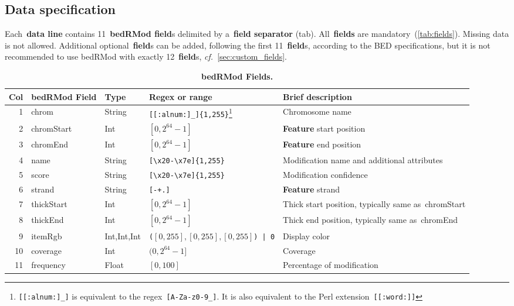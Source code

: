 \documentclass[11pt]{article}
\begin{document}
\subsection{Data specification}\label{sec:data}

Each~\textbf{data line} contains 11~\textbf{\acs{bedRMod} field}s delimited by a~\textbf{field separator} (tab).
All~\textbf{fields} are mandatory~(\autoref{tab:fields}). Missing data is not allowed.
Additional optional~\textbf{field}s can be added, following the first 11~\textbf{field}s, according to the \acs{BED} specifications, but 
it is not recommended to use \acs{bedRMod} with exactly 12~\textbf{field}s, \textit{cf.}~\autoref{sec:custom_fields}.

\begin{savenotes}
  \begin{table}
    \begin{adjustwidth}{-0.5in}{-0.5in}
      \begin{tabularx}{\linewidth}{r l l l L}
        \toprule
        Col & \acs{bedRMod} Field & Type & Regex or range & Brief description \\
        & \textsf{chrom}
        & String
        & \texttt{[[:alnum:]\_]\{1,255\}}\footnote{\texttt{[[:alnum:]\_]} is equivalent to the \ac{regex}~\texttt{[A-Za-z0-9\_]}. %
        It is also equivalent to the Perl extension~\texttt{[[:word:]]}}
        & Chromosome name \\
        2 & \textsf{chromStart} & Int & $[0, 2^{64}-1]$ & \textbf{Feature} start position \\
        3 & \textsf{chromEnd} & Int & $[0, 2^{64} -1]$ & \textbf{Feature} end position \\
        4 
        & \textsf{name} 
        & String 
        & \texttt{[{\textbackslash}x20-{\textbackslash}x7e]\{1,255\}} 
        & Modification name and additional attributes \\
        5 & \textsf{score} & String & \texttt{[{\textbackslash}x20-{\textbackslash}x7e]\{1,255\}} & Modification confidence \\
        6 & \textsf{strand} & String & \texttt{[-+.]} & \textbf{Feature} strand \\
        7 & \textsf{thickStart} & Int & $[0, 2^{64}-1]$ & Thick start position, typically same as~\textsf{chromStart} \\
        8 & \textsf{thickEnd} & Int & $[0, 2^{64}-1]$ & Thick end position, typically same as~\textsf{chromEnd} \\
        9 & \textsf{itemRgb} & Int,Int,Int & \texttt{(}$[0, 255], [0,255], [0,255]$\texttt{) | 0} & Display color \\ %
        10 & \textsf{coverage} & Int &  $(0, 2^{64}-1]$ & Coverage \\
        11 & \textsf{frequency} & Float & $[0, 100]$ & Percentage of modification \\
        \bottomrule
      \end{tabularx}
    \end{adjustwidth}
    \caption{\textbf{\acs{bedRMod} Fields.}}\label{tab:fields}
  \end{table}
\end{savenotes}
\end{document}
